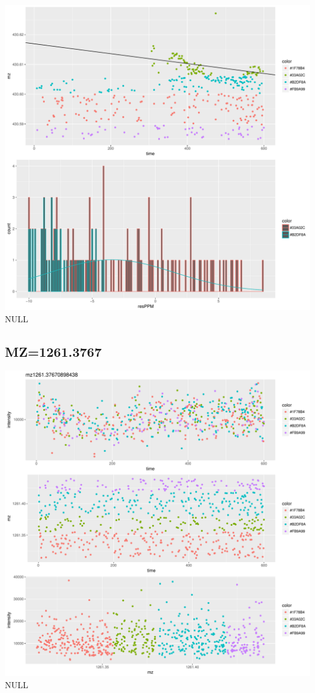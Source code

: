 \documentclass[]{article}
\begin{document}
\includegraphics{Supplementary_document_files/figure-latex/filter.lm.430-1.pdf}
NULL

\subsection{MZ=1261.3767}\label{mz1261.3767}

\includegraphics{Supplementary_document_files/figure-latex/cluster.mz.1261-1.pdf}
NULL
\end{document}
